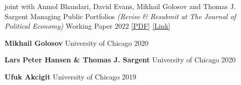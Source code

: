


\begin{cventries}

	\cventry
	{joint with Anmol Bhandari, David Evans, Mikhail Golosov and Thomas J. Sargent} %
	{Managing Public Portfolios \textit{(Revise \& Resubmit at The Journal of Political Economy)}}  %
	{Working Paper} %
	{2022} %
	{\href{https://static1.squarespace.com/static/54c19f18e4b0ef5f4b9f8dae/t/6328ee5213a65c43a48423f8/1663626851912/abegs4draft.pdf}{[PDF]} \href{https://www.nber.org/papers/w30501}{[Link]}}

\end{cventries}


\begin{cvhonors}
	\cvhonor
	{\textbf{Mikhail Golosov}} %
	{University of Chicago} %
	{} %
	{2020} %

	\cvhonor
	{\textbf{Lars Peter Hansen \& Thomas J. Sargent}} %
	{University of Chicago} %
	{} %
	{2020} %

	\cvhonor
	{\textbf{Ufuk Akcigit}} %
	{University of Chicago} %
	{} %
	{2019} %

\end{cvhonors}

